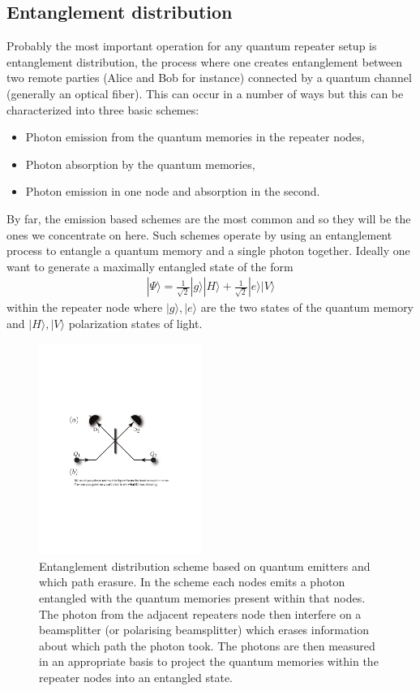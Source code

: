 \documentclass[twocolumn, aps, rmp, amsmath, amssymb, nofootinbib, superscriptaddress, longbibliography, floatfix, table-of-contents, eqsecnum]{revtex4-1}
\begin{document}
\subsection{Entanglement distribution}

Probably the most important operation for any quantum repeater setup is entanglement distribution, the process where one creates entanglement between two remote parties (Alice and Bob for instance) connected by a quantum channel (generally an optical fiber). This can occur in a number of ways \cite{Bennett96,enk98,bennett93,SSRG09,childress06,loock06,munro08} but this can be characterized into three basic schemes:
\begin{itemize}
\item Photon emission from the quantum memories in the repeater nodes,
\item Photon absorption by the quantum memories,
\item Photon emission in one node and absorption in the second.
\end{itemize}
By far, the emission based schemes are the most common and so they will be the ones we concentrate on here. Such schemes operate by using an entanglement process to entangle a quantum memory and a single photon together. Ideally one want to generate a maximally entangled state of the form \cite{WJM2015}
\begin{align}
|\Psi\rangle=\frac{1}{\sqrt{2}} |g\rangle |H\rangle + \frac{1}{\sqrt{2}} |e\rangle |V\rangle
\end{align}
within the repeater node where $|g\rangle,  |e\rangle$ are the two states of the quantum memory and $ |H\rangle, |V\rangle$ polarization states of light. 
\begin{figure}[!htb]
\begin{center}
\includegraphics[width=0.475\textwidth]{repeaters_3}
\end{center}
\caption{Entanglement distribution scheme based on quantum emitters and which path erasure. In the scheme each nodes emits a photon entangled with the quantum memories present within that nodes. The photon from the adjacent repeaters node then interfere on a beamsplitter (or polarising  beamsplitter) which erases information about which path the photon took. The photons are then measured in an appropriate basis to project the quantum memories  within the repeater nodes into an entangled state.} 
\label{fig3}
\end{figure} 
\end{document}
